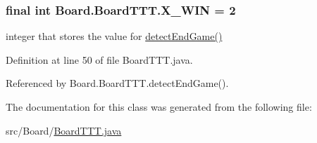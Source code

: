 \subsubsection[{X\+\_\+\+W\+I\+N}]{\setlength{\rightskip}{0pt plus 5cm}final int Board.\+Board\+T\+T\+T.\+X\+\_\+\+W\+I\+N = 2\hspace{0.3cm}{\ttfamily [static]}}\label{class_board_1_1_board_t_t_t_ab77ee706643fb1825e78f6b8dcacc021}
integer that stores the value for \hyperlink{class_board_1_1_board_t_t_t_a08f36da4210111d8f129be28a550334e}{detect\+End\+Game()} 

Definition at line 50 of file Board\+T\+T\+T.\+java.



Referenced by Board.\+Board\+T\+T\+T.\+detect\+End\+Game().



The documentation for this class was generated from the following file\+:\begin{DoxyCompactItemize}
\item 
src/\+Board/\hyperlink{_board_t_t_t_8java}{Board\+T\+T\+T.\+java}\end{DoxyCompactItemize}
